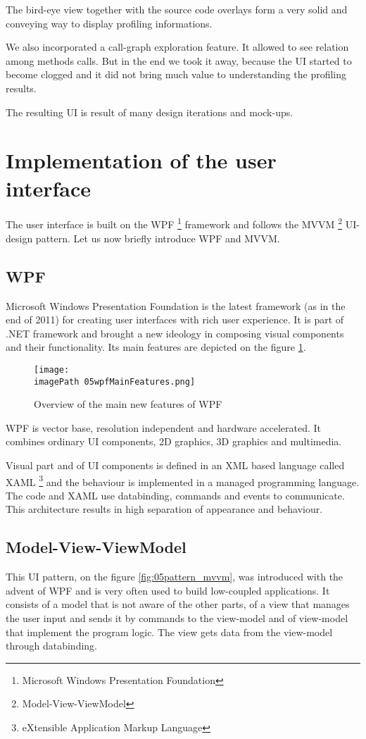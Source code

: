 The bird-eye view together with the source code overlays form a very solid and conveying way to display profiling informations. 

We also incorporated a call-graph exploration feature. It allowed to see relation among methods calls. But in the end we took it away, because the UI started to become clogged and it did not bring much value to understanding the profiling results. 

The resulting UI is result of many design iterations and mock-ups.

\section{Implementation of the user interface}
The user interface is built on the WPF \footnote{Microsoft Windows Presentation Foundation} framework \cite{WPF4Unleashed} and follows the MVVM \footnote{Model-View-ViewModel} \cite{MVVM2011} UI-design pattern. Let us now briefly introduce WPF and MVVM.

\subsection{WPF}
Microsoft Windows Presentation Foundation is the latest framework (as in the end of 2011) for creating user interfaces with rich user experience. It is part of .NET framework and brought a new ideology in composing visual components and their functionality. Its main features are depicted on the figure \ref{fig:05wpfMainFeatures}.

\begin{figure}
	\centering
		\texttt{[image: \\imagePath 05wpfMainFeatures.png]}
		\caption{Overview of the main new features of WPF \cite{WPFpage}}
	\label{fig:05wpfMainFeatures}
\end{figure}

WPF is vector base, resolution independent and hardware accelerated. It combines ordinary UI components, 2D graphics, 3D graphics and multimedia. 

Visual part and of UI components is defined in an XML based language called \linebreak XAML \footnote{eXtensible Application Markup Language} and the behaviour is implemented in a managed programming language. The code and XAML use databinding, commands and events to communicate. This architecture results in high separation of appearance and behaviour.

\subsection{Model-View-ViewModel}
This UI pattern, on the figure \ref{fig:05pattern_mvvm}, was introduced with the advent of WPF and is very often used to build low-coupled applications. It consists of a model that is not aware of the other parts, of a view that manages the user input and sends it by commands to the view-model and of view-model that implement the program logic. The view gets data from the view-model through databinding.

